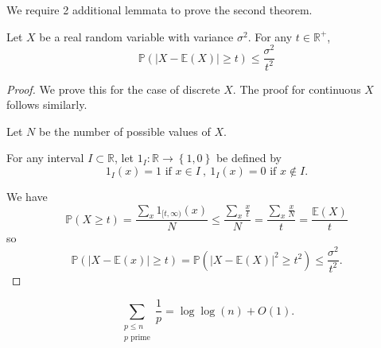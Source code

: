 \documentclass[12pt,reqno]{amsart}
\begin{document}
We require 2 additional lemmata to prove the second theorem.

\begin{lemma*}
Let \(X\) be a real random variable with variance \(\sigma^{2}\). For any \(t \in \mathbb{R} ^{+}\),
\[
    \mathbb{P} \left( \left\lvert X - \mathbb{E} (X) \right\rvert \geq t \right) \leq \frac{\sigma^{2}}{t^{2}} 
\]
\end{lemma*}

\begin{proof}
We prove this for the case of discrete \(X\).
The proof for continuous \(X\) follows similarly.

Let \(N\) be the number of possible values of \(X\).

For any interval \(I \subset \mathbb{R} \), let \(1_{I} : \mathbb{R} \to \left\{ 1,0 \right\} \) be
defined by
\[
    1_{I} (x) = 1 \text{ if } x \in I ~,~ 1_{I} (x) = 0 \text{ if } x \not \in I
.\]

We have
\[
    \mathbb{P} (X \geq t) = \frac{ \sum _{x} 1_{[t,\infty )} (x)}{N} \leq \frac{ \sum _{x} \frac{x}{t} }{N} = \frac{ \sum _{x} \frac{x}{N} }{t}  = \frac{\mathbb{E} (X)}{t} 
\]
so
\[
    \mathbb{P} \left( \left\lvert X - \mathbb{E} (x) \right\rvert \geq t \right) =\mathbb{P} \left( \left\lvert X - \mathbb{E} (X) \right\rvert ^{2} \geq t ^{2} \right) \leq \frac{\sigma^{2}}{t^{2}} 
.\]
\end{proof}

\begin{lemma*}
\[
    \sum _{\substack{ p \leq n \\ p\text{ prime}  }} \frac{1}{p}  = \log\log \left( n \right) + O(1)
.\]
\end{lemma*}
\end{document}
